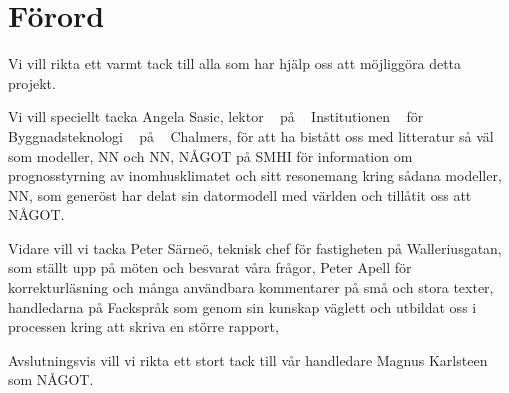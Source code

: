 \chapter*{Förord}


Vi vill rikta ett varmt tack till alla som har hjälp oss att möjliggöra detta projekt. 

Vi vill speciellt tacka Angela Sasic, lektor   på   Institutionen   för   Byggnadsteknologi   på   Chalmers, för att ha bistått oss med litteratur så väl som modeller, NN och NN, NÅGOT på SMHI för information om prognosstyrning av inomhusklimatet och sitt resonemang kring sådana modeller, NN, som generöst har delat sin datormodell med världen och tillåtit oss att NÅGOT.

Vidare vill vi tacka Peter Särneö, teknisk chef för fastigheten på Walleriusgatan, som ställt upp på möten och besvarat våra frågor, Peter Apell för korrekturläsning och många användbara kommentarer på små och stora texter, handledarna på Fackspråk som genom sin kunskap väglett och utbildat oss i processen kring att skriva en större rapport,

Avslutningsvis vill vi rikta ett stort tack till vår handledare Magnus Karlsteen som NÅGOT.

